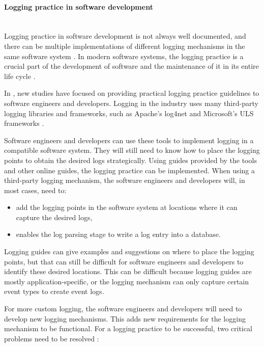 \paragraph{Logging practice in software development}\label{sec:ch1_loggingPractice}\leavevmode\\
Logging practice in software development is not always well documented, and there can be multiple implementations of different logging mechanisms in the same software system \cite{Pecchia2015, Kitchenham2007}. In modern software systems, the logging practice is a crucial part of the development of software and the maintenance of it in its entire life cycle \cite{Rong2018}.\par In , new studies have focused on providing practical logging practice guidelines to software engineers and developers. Logging in the industry uses many third-party logging libraries and frameworks, such as Apache's log4net and Microsoft's ULS frameworks \cite{Zhu2015, Rong2018}.\par Software engineers and developers can use these tools to implement logging in a compatible software system. They will still need to know how to place the logging points to obtain the desired logs strategically. Using guides provided by the tools and other online guides, the logging practice can be implemented. When using a third-party logging mechanism, the software engineers and developers will, in most cases, need to:

\begin{itemize}
	\item add the logging points in the software system at locations where it can capture the desired logs,
	\item enables the log parsing stage to write a log entry into a database.
\end{itemize}

Logging guides can give examples and suggestions on where to place the logging points, but that can still be difficult for software engineers and developers to identify these desired locations. This can be difficult because logging guides are mostly application-specific, or the logging mechanism can only capture certain event types to create event logs. \par For more custom logging, the software engineers and developers will need to develop new logging mechanisms. This adds new requirements for the logging mechanism to be functional. For a logging practice to be successful, two critical problems need to be resolved \cite{Zhu2015, Zhu2019, Rong2018}:

